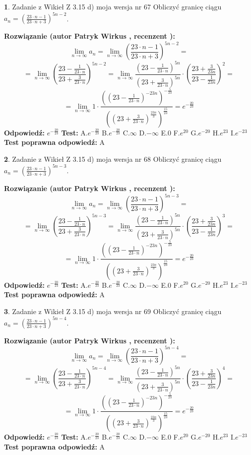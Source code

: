 \documentclass[12pt, a4paper]{article}
\theoremstyle{definition} %
\newtheorem{zad}{}
\newcommand{\zadStart}[1]{\begin{zad}#1\newline}
\newcommand{\zadStop}{\end{zad}}
\newcommand{\rozwStart}[2]{\noindent \textbf{Rozwiązanie (autor #1 , recenzent #2): }\newline}
\newcommand{\rozwStop}{\newline}
\newcommand{\odpStart}{\noindent \textbf{Odpowiedź:}\newline}
\newcommand{\odpStop}{\newline}
\newcommand{\testStart}{\noindent \textbf{Test:}\newline}
\newcommand{\testStop}{\newline}
\newcommand{\kluczStart}{\noindent \textbf{Test poprawna odpowiedź:}\newline}
\newcommand{\kluczStop}{\newline}
\begin{document}
\zadStart{Zadanie z Wikieł Z 3.15 d) moja wersja nr 67}
Obliczyć granicę ciągu $a_{n}=(\frac{23\cdot n - 1}{23 \cdot n + 3})^{5n-2}$.
\zadStop
\rozwStart{Patryk Wirkus}{}
$$\lim\limits_{n\to\infty} a_{n} = \lim\limits_{n\to\infty}(\frac{23\cdot n - 1}{23 \cdot n + 3})^{5n-2}=$$
$$=\lim\limits_{n\to\infty}(\frac{23 - \frac{1}{23\cdot n}}{23 + \frac{3}{23 \cdot n}})^{5n-2}=\lim\limits_{n\to\infty}\frac{(23 - \frac{1}{23\cdot n})^{5n}}{(23 + \frac{3}{23\cdot n})^{5n}} \cdot (\frac{23+\frac{3}{23n}}{23-\frac{1}{23n}})^{2}=$$
$$=\lim\limits_{n\to\infty} 1 \cdot \frac{((23-\frac{1}{23 \cdot n})^{-23n})^{-\frac{5}{23}}}{((23+\frac{3}{23 \cdot n})^{\frac{23n}{3}})^{\frac{15}{23}}} =e^{-\frac{20}{23}}$$
\rozwStop
\odpStart
$e^{-\frac{20}{23}}$
\odpStop
\testStart
A.$ e^{-\frac{20}{23}}$
B.$ e^{-\frac{20}{23}}$
C.$\infty$
D.$-\infty$
E.$0$
F.$e^{20}$
G.$e^{-20}$
H.$e^{23}$
I.$e^{-23}$
\testStop
\kluczStart
A
\kluczStop



\zadStart{Zadanie z Wikieł Z 3.15 d) moja wersja nr 68}
Obliczyć granicę ciągu $a_{n}=(\frac{23\cdot n - 1}{23 \cdot n + 3})^{5n-3}$.
\zadStop
\rozwStart{Patryk Wirkus}{}
$$\lim\limits_{n\to\infty} a_{n} = \lim\limits_{n\to\infty}(\frac{23\cdot n - 1}{23 \cdot n + 3})^{5n-3}=$$
$$=\lim\limits_{n\to\infty}(\frac{23 - \frac{1}{23\cdot n}}{23 + \frac{3}{23 \cdot n}})^{5n-3}=\lim\limits_{n\to\infty}\frac{(23 - \frac{1}{23\cdot n})^{5n}}{(23 + \frac{3}{23\cdot n})^{5n}} \cdot (\frac{23+\frac{3}{23n}}{23-\frac{1}{23n}})^{3}=$$
$$=\lim\limits_{n\to\infty} 1 \cdot \frac{((23-\frac{1}{23 \cdot n})^{-23n})^{-\frac{5}{23}}}{((23+\frac{3}{23 \cdot n})^{\frac{23n}{3}})^{\frac{15}{23}}} =e^{-\frac{20}{23}}$$
\rozwStop
\odpStart
$e^{-\frac{20}{23}}$
\odpStop
\testStart
A.$ e^{-\frac{20}{23}}$
B.$ e^{-\frac{20}{23}}$
C.$\infty$
D.$-\infty$
E.$0$
F.$e^{20}$
G.$e^{-20}$
H.$e^{23}$
I.$e^{-23}$
\testStop
\kluczStart
A
\kluczStop



\zadStart{Zadanie z Wikieł Z 3.15 d) moja wersja nr 69}
Obliczyć granicę ciągu $a_{n}=(\frac{23\cdot n - 1}{23 \cdot n + 3})^{5n-4}$.
\zadStop
\rozwStart{Patryk Wirkus}{}
$$\lim\limits_{n\to\infty} a_{n} = \lim\limits_{n\to\infty}(\frac{23\cdot n - 1}{23 \cdot n + 3})^{5n-4}=$$
$$=\lim\limits_{n\to\infty}(\frac{23 - \frac{1}{23\cdot n}}{23 + \frac{3}{23 \cdot n}})^{5n-4}=\lim\limits_{n\to\infty}\frac{(23 - \frac{1}{23\cdot n})^{5n}}{(23 + \frac{3}{23\cdot n})^{5n}} \cdot (\frac{23+\frac{3}{23n}}{23-\frac{1}{23n}})^{4}=$$
$$=\lim\limits_{n\to\infty} 1 \cdot \frac{((23-\frac{1}{23 \cdot n})^{-23n})^{-\frac{5}{23}}}{((23+\frac{3}{23 \cdot n})^{\frac{23n}{3}})^{\frac{15}{23}}} =e^{-\frac{20}{23}}$$
\rozwStop
\odpStart
$e^{-\frac{20}{23}}$
\odpStop
\testStart
A.$ e^{-\frac{20}{23}}$
B.$ e^{-\frac{20}{23}}$
C.$\infty$
D.$-\infty$
E.$0$
F.$e^{20}$
G.$e^{-20}$
H.$e^{23}$
I.$e^{-23}$
\testStop
\kluczStart
A
\kluczStop
\end{document}
